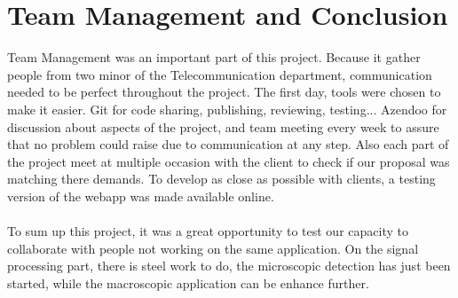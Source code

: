 %
%
\section{Team Management and Conclusion}
Team Management was an important part of this project. Because it gather people from two minor of the Telecommunication department, communication needed to be perfect throughout the project. The first day, tools were chosen to make it easier. Git for code sharing, publishing, reviewing, testing... Azendoo for discussion about aspects of the project, and team meeting every week to assure that no problem could raise due to communication at any step. Also each part of the project meet at multiple occasion with the client to check if our proposal was matching there demands. To develop as close as possible with clients, a testing version of the webapp was made available online.\\\\

To sum up this project, it was a great opportunity to test our capacity to collaborate with people not working on the same application. On the signal processing part, there is steel work to do, the microscopic detection has just been started, while the macroscopic application can be enhance further.